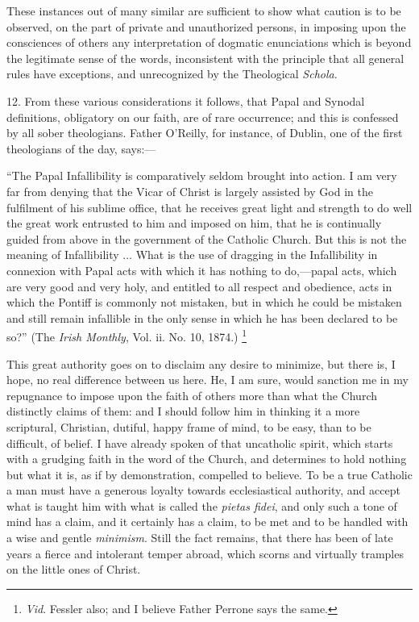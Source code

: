 These instances out of many similar are sufficient to show what
caution is to be observed, on the part of private and unauthorized
persons, in imposing upon the consciences of others any interpretation
of dogmatic enunciations which is beyond the legitimate sense of
the words, inconsistent with the principle that all general rules have
exceptions, and unrecognized by the Theological \emph{Schola}.

12. From these various considerations it follows, that Papal and
Synodal definitions, obligatory on our faith, are of rare occurrence;
and this is confessed by all sober theologians. Father O'Reilly, for
instance, of Dublin, one of the first theologians of the day, says:—

``The Papal Infallibility is comparatively seldom brought into
action. I am very far from denying that the Vicar of Christ is largely
assisted by God in the fulfilment of his sublime office, that he
receives great light and strength to do well the great work entrusted to
him and imposed on him, that he is continually guided from above in the
government of the Catholic Church. But this is not the meaning of
Infallibility ... What is the use of dragging in the Infallibility in
connexion with Papal acts with which it has nothing to do,—papal acts,
which are very good and very holy, and entitled to all respect and
obedience, acts in which the Pontiff is commonly not mistaken, but in
which he could be mistaken and still remain infallible in the only sense
in which he has been declared to be so?'' (The \emph{Irish Monthly},
Vol. ii. No. 10, 1874.) \footnote{\emph{Vid}. Fessler also; and I believe Father Perrone says the
same.}

This great authority goes on to disclaim any desire to minimize, but
there is, I hope, no real difference between us here. He, I am sure,
would sanction me in my repugnance to impose upon the faith of others
more than what the Church distinctly claims of them: and I should
follow him in thinking it a more scriptural, Christian, dutiful, happy
frame of mind, to be easy, than to be difficult, of belief. I have
already spoken of that uncatholic spirit, which starts with a grudging
faith in the word of the Church, and determines to hold nothing but what
it is, as if by demonstration, compelled to believe. To be a true
Catholic a man must have a generous loyalty towards ecclesiastical
authority, and accept what is taught him with what is called the \emph{pietas
fidei}, and only such a tone of mind has a claim, and it certainly
has a claim, to be met and to be handled with a wise and gentle \emph{minimism}.
Still the fact remains, that there has been of late years a fierce and
intolerant temper abroad, which scorns and virtually tramples on the
little ones of Christ.

